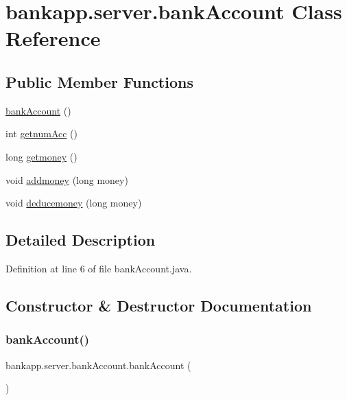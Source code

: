 \hypertarget{classbankapp_1_1server_1_1bank_account}{}\section{bankapp.\+server.\+bank\+Account Class Reference}
\label{classbankapp_1_1server_1_1bank_account}
\subsection*{Public Member Functions}
\begin{DoxyCompactItemize}
\item 
\hyperlink{classbankapp_1_1server_1_1bank_account_ac69962d0e67c62d23bb1caa4ffd09d6b}{bank\+Account} ()
\item 
int \hyperlink{classbankapp_1_1server_1_1bank_account_a59c7532089ad72e06d43b3360d0f1ef4}{getnum\+Acc} ()
\item 
long \hyperlink{classbankapp_1_1server_1_1bank_account_ab66d3d80e858de46f26719628efa6ead}{getmoney} ()
\item 
void \hyperlink{classbankapp_1_1server_1_1bank_account_a1d9c03e89357753b211586186349dccf}{addmoney} (long money)
\item 
void \hyperlink{classbankapp_1_1server_1_1bank_account_ae68ea661e15b58e9843e72d6e71df834}{deducemoney} (long money)
\end{DoxyCompactItemize}


\subsection{Detailed Description}


Definition at line 6 of file bank\+Account.\+java.



\subsection{Constructor \& Destructor Documentation}
\mbox{\label{classbankapp_1_1server_1_1bank_account_ac69962d0e67c62d23bb1caa4ffd09d6b}} 
\subsubsection{\texorpdfstring{bank\+Account()}{bankAccount()}}
{\footnotesize\ttfamily bankapp.\+server.\+bank\+Account.\+bank\+Account (\begin{DoxyParamCaption}{ }\end{DoxyParamCaption})}



